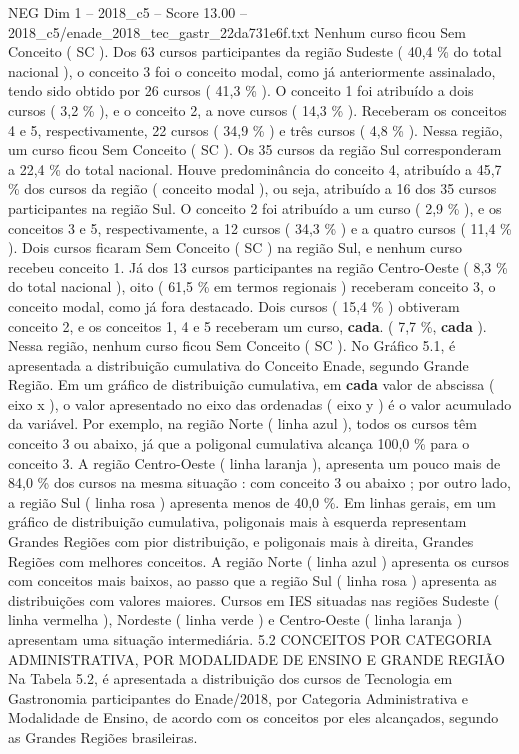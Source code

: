 \begin{textsample}{NEG Dim 1 – 2018\_c5 – Score 13.00 – 2018\_c5/enade\_2018\_tec\_gastr\_22da731e6f.txt}
Nenhum curso ficou Sem Conceito ( SC ).
Dos 63 cursos participantes da região Sudeste ( 40,4 \% do total nacional ), o conceito 3 foi o conceito modal, como já anteriormente assinalado, tendo sido obtido por 26 cursos ( 41,3 \% ).
O conceito 1 foi atribuído a dois cursos ( 3,2 \% ), e o conceito 2, a nove cursos ( 14,3 \% ).
Receberam os conceitos 4 e 5, respectivamente, 22 cursos ( 34,9 \% ) e três cursos ( 4,8 \% ).
Nessa região, um curso ficou Sem Conceito ( SC ).
Os 35 cursos da região Sul corresponderam a 22,4 \% do total nacional.
Houve predominância do conceito 4, atribuído a 45,7 \% dos cursos da região ( conceito modal ), ou seja, atribuído a 16 dos 35 cursos participantes na região Sul.
O conceito 2 foi atribuído a um curso ( 2,9 \% ), e os conceitos 3 e 5, respectivamente, a 12 cursos ( 34,3 \% ) e a quatro cursos ( 11,4 \% ).
Dois cursos ficaram Sem Conceito ( SC ) na região Sul, e nenhum curso recebeu conceito 1.
Já dos 13 cursos participantes na região Centro-Oeste ( 8,3 \% do total nacional ), oito ( 61,5 \% em termos regionais ) receberam conceito 3, o conceito modal, como já fora destacado.
Dois cursos ( 15,4 \% ) obtiveram conceito 2, e os conceitos 1, 4 e 5 receberam um curso, \textbf{cada}. ( 7,7 \%, \textbf{cada} ).
Nessa região, nenhum curso ficou Sem Conceito ( SC ).
No Gráfico 5.1, é apresentada a distribuição cumulativa do Conceito Enade, segundo Grande Região.
Em um gráfico de distribuição cumulativa, em \textbf{cada} valor de abscissa ( eixo x ), o valor apresentado no eixo das ordenadas ( eixo y ) é o valor acumulado da variável.
Por exemplo, na região Norte ( linha azul ), todos os cursos têm conceito 3 ou abaixo, já que a poligonal cumulativa alcança 100,0 \% para o conceito 3.
A região Centro-Oeste ( linha laranja ), apresenta um pouco mais de 84,0 \% dos cursos na mesma situação : com conceito 3 ou abaixo ; por outro lado, a região Sul ( linha rosa ) apresenta menos de 40,0 \%.
Em linhas gerais, em um gráfico de distribuição cumulativa, poligonais mais à esquerda representam Grandes Regiões com pior distribuição, e poligonais mais à direita, Grandes Regiões com melhores conceitos.
A região Norte ( linha azul ) apresenta os cursos com conceitos mais baixos, ao passo que a região Sul ( linha rosa ) apresenta as distribuições com valores maiores.
Cursos em IES situadas nas regiões Sudeste ( linha vermelha ), Nordeste ( linha verde ) e Centro-Oeste ( linha laranja ) apresentam uma situação intermediária. 5.2 CONCEITOS POR CATEGORIA ADMINISTRATIVA, POR MODALIDADE DE ENSINO E GRANDE REGIÃO Na Tabela 5.2, é apresentada a distribuição dos cursos de Tecnologia em Gastronomia participantes do Enade/2018, por Categoria Administrativa e Modalidade de Ensino, de acordo com os conceitos por eles alcançados, segundo as Grandes Regiões brasileiras.

\end{textsample}
